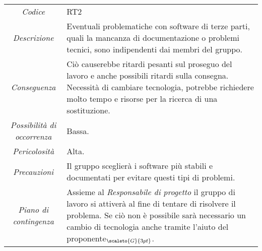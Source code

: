 {{	\begin{center}
		\renewcommand{\arraystretch}{1.4}
		\begin{tabularx}{\textwidth}{|c|X|}
			\hline
			\rowcolor{airforceblue}
			\multicolumn{2}{|c|}{\textit{Software terze parti}}\\
			\hline
			\textit{Codice} & RT2 \\
			\hline
			\textit{Descrizione} & Eventuali problematiche con software di terze parti, quali la mancanza di documentazione o problemi tecnici, sono indipendenti dai membri del gruppo. \\
			\hline
			\textit{Conseguenza} & Ciò causerebbe ritardi pesanti sul proseguo del lavoro e anche possibili ritardi sulla consegna.
			Necessità di cambiare tecnologia, potrebbe richiedere molto tempo e risorse per la ricerca di una sostituzione. \\
			\hline
			\textit{Possibilità di occorrenza} & Bassa. \\
			\hline
			\textit{Pericolosità} & Alta. \\
			\hline
			\textit{Precauzioni} & Il gruppo sceglierà i software più stabili e documentati per evitare questi tipi di problemi.  \\
			\hline
			\textit{Piano di contingenza} & Assieme al \textit{Responsabile di progetto} il gruppo di lavoro si attiverà al fine di tentare di risolvere il problema. Se ciò non è possibile sarà necessario un cambio di tecnologia anche tramite l'aiuto del proponente$_{\scaleto{G}{3pt}}$.  \\
			\hline
		\end{tabularx}
	\end{center}


\def\tabularxcolumn#1{m{#1}}
{
	
}}}
